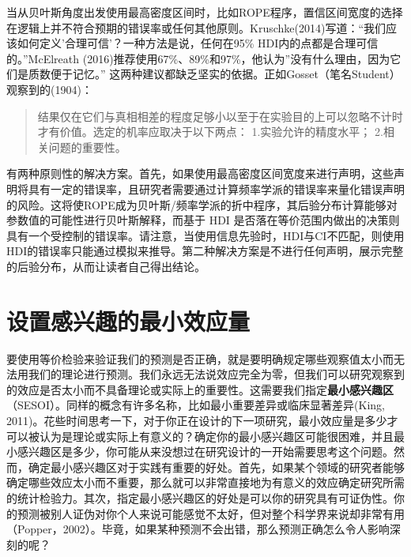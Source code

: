 \documentclass[
  letterpaper,
  DIV=11,
  numbers=noendperiod]{scrreprt}
\begin{document}
当从贝叶斯角度出发使用最高密度区间时，比如ROPE程序，置信区间宽度的选择在逻辑上并不符合预期的错误率或任何其他原则。Kruschke(2014)写道：``我们应该如何定义'合理可信'？一种方法是说，任何在95\%
HDI内的点都是合理可信的。''McElreath
(2016)推荐使用67\%、89\%和97\%，他认为''没有什么理由，因为它们是质数便于记忆。''
这两种建议都缺乏坚实的依据。正如Gosset（笔名Student）观察到的(1904)：

\begin{quote}
结果仅在它们与真相相差的程度足够小以至于在实验目的上可以忽略不计时才有价值。选定的机率应取决于以下两点：
1.实验允许的精度水平； 2.相关问题的重要性。
\end{quote}

有两种原则性的解决方案。首先，如果使用最高密度区间宽度来进行声明，这些声明将具有一定的错误率，且研究者需要通过计算频率学派的错误率来量化错误声明的风险。这将使ROPE成为贝叶斯/频率学派的折中程序，其后验分布计算能够对参数值的可能性进行贝叶斯解释，而基于
HDI
是否落在等价范围内做出的决策则具有一个受控制的错误率。请注意，当使用信息先验时，HDI与CI不匹配，则使用HDI的错误率只能通过模拟来推导。第二种解决方案是不进行任何声明，展示完整的后验分布，从而让读者自己得出结论。

\hypertarget{sec-sesoi}{%
\section{设置感兴趣的最小效应量}\label{sec-sesoi}}

要使用等价检验来验证我们的预测是否正确，就是要明确规定哪些观察值太小而无法用我们的理论进行预测。我们永远无法说效应完全为零，但我们可以研究观察到的效应是否太小而不具备理论或实际上的重要性。这需要我们指定\textbf{最小感兴趣区}（SESOI）。同样的概念有许多名称，比如最小重要差异或临床显著差异(King,
2011)。花些时间思考一下，对于你正在设计的下一项研究，最小效应量是多少才可以被认为是理论或实际上有意义的？确定你的最小感兴趣区可能很困难，并且最小感兴趣区是多少，你可能从来没想过在研究设计的一开始需要思考这个问题。然而，确定最小感兴趣区对于实践有重要的好处。首先，如果某个领域的研究者能够确定哪些效应太小而不重要，那么就可以非常直接地为有意义的效应确定研究所需的统计检验力。其次，指定最小感兴趣区的好处是可以你的研究具有可证伪性。你的预测被别人证伪对你个人来说可能感觉不太好，但对整个科学界来说却非常有用（Popper，2002）。毕竟，如果某种预测不会出错，那么预测正确怎么令人影响深刻的呢？
\end{document}
